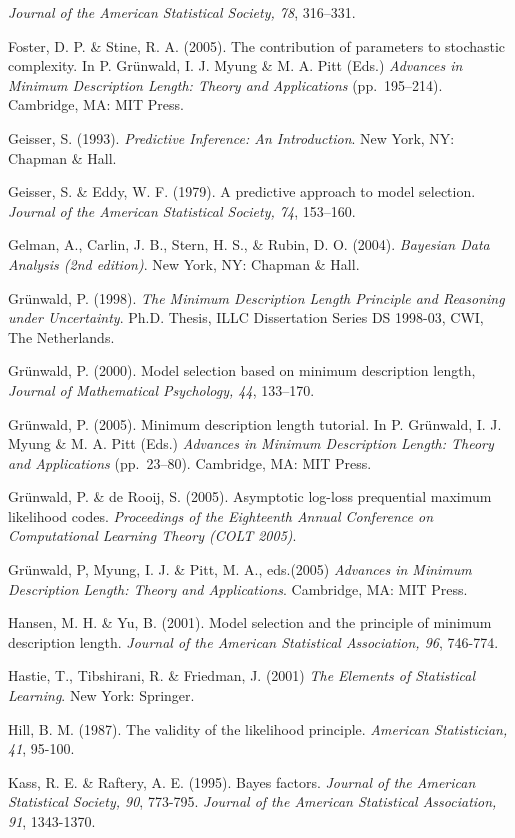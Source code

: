 \documentclass{elsart}
\begin{document}
\begin{list}{}{\setlength{\leftmargin}{12pt}\setlength{\itemindent}{-12pt}\setlength{\parsep}{0pt}}
{\it Journal of the American Statistical Society, 78}, 316--331.
\item Foster, D. P. \& Stine, R. A. (2005). The contribution of parameters to stochastic complexity. In P.
Gr\"{u}nwald, I. J. Myung \& M. A. Pitt (Eds.) {\it Advances in Minimum Description Length: Theory
and Applications} (pp.~195--214). Cambridge, MA: MIT Press.
\item Geisser, S. (1993). {\it Predictive Inference: An Introduction}. New York, NY: Chapman \& Hall.
\item Geisser, S. \& Eddy, W. F. (1979). A predictive approach to model selection. {\it Journal of the
American Statistical Society, 74}, 153--160.
\item Gelman, A., Carlin, J. B., Stern, H. S., \& Rubin, D. O. (2004). {\it Bayesian Data Analysis (2nd
edition)}. New York, NY: Chapman \& Hall.
\item Gr\"{u}nwald, P. (1998). {\it The Minimum Description Length Principle and Reasoning under
Uncertainty}. Ph.D. Thesis, ILLC Dissertation Series DS 1998-03, CWI, The Netherlands.
\item Gr{\"{u}}nwald, P. (2000). Model selection based on minimum description length,
  {\em Journal of Mathematical Psychology, 44}, 133--170.
\item Gr\"{u}nwald, P. (2005). Minimum description length tutorial. In P. Gr\"{u}nwald, I. J. Myung \&
M. A. Pitt (Eds.) {\it Advances in Minimum Description Length: Theory and Applications}
(pp.~23--80). Cambridge, MA: MIT Press.
\item Gr\"{u}nwald, P. \& de Rooij, S. (2005). Asymptotic log-loss prequential maximum likelihood codes.
{\it Proceedings of the Eighteenth Annual Conference on Computational Learning Theory (COLT
2005)}.
\item Gr\"{u}nwald, P, Myung, I. J. \& Pitt, M. A., eds.(2005) {\it Advances in Minimum Description Length:
Theory and Applications}. Cambridge, MA: MIT Press.
\item Hansen, M. H. \& Yu, B. (2001). Model selection and the principle of minimum description length.
{\it Journal of the American Statistical Association, 96}, 746-774.
\item Hastie, T., Tibshirani, R. \& Friedman, J. (2001) {\it The Elements of Statistical Learning}. New York:
Springer.
\item Hill, B. M. (1987). The validity of the likelihood principle. {\it American Statistician, 41}, 95-100.
\item Kass, R. E. \& Raftery, A. E. (1995). Bayes factors. {\it Journal of the American Statistical Society, 90}, 773-795. {\it Journal of the American Statistical Association, 91}, 1343-1370.

\end{list}
\end{document}
